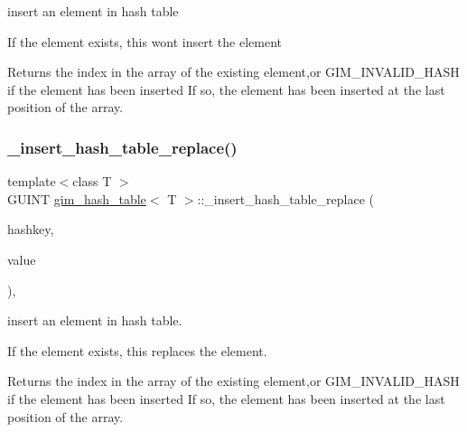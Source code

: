 insert an element in hash table 

If the element exists, this won\textquotesingle{}t insert the element \begin{DoxyReturn}{Returns}
the index in the array of the existing element,or G\+I\+M\+\_\+\+I\+N\+V\+A\+L\+I\+D\+\_\+\+H\+A\+SH if the element has been inserted If so, the element has been inserted at the last position of the array. 
\end{DoxyReturn}
\mbox{\label{classgim__hash__table_a6ebfb7415bd946855ec5730651f7c191}} 
\subsubsection{\texorpdfstring{\+\_\+insert\+\_\+hash\+\_\+table\+\_\+replace()}{\_insert\_hash\_table\_replace()}\hspace{0.1cm}{\footnotesize\ttfamily [1/2]}}
{\footnotesize\ttfamily template$<$class T $>$ \\
G\+U\+I\+NT \hyperlink{classgim__hash__table}{gim\+\_\+hash\+\_\+table}$<$ T $>$\+::\+\_\+insert\+\_\+hash\+\_\+table\+\_\+replace (\begin{DoxyParamCaption}\item[{G\+U\+I\+NT}]{hashkey,  }\item[{const T \&}]{value }\end{DoxyParamCaption})\hspace{0.3cm}{\ttfamily [inline]}, {\ttfamily [protected]}}



insert an element in hash table. 

If the element exists, this replaces the element. \begin{DoxyReturn}{Returns}
the index in the array of the existing element,or G\+I\+M\+\_\+\+I\+N\+V\+A\+L\+I\+D\+\_\+\+H\+A\+SH if the element has been inserted If so, the element has been inserted at the last position of the array. 
\end{DoxyReturn}
\mbox{\label{classgim__hash__table_a6ebfb7415bd946855ec5730651f7c191}} 

